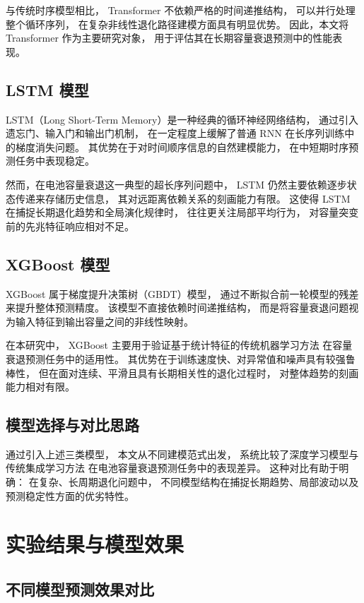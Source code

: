\documentclass[UTF8,a4paper,12pt,fontset=fandol]{ctexart}
\begin{document}
与传统时序模型相比，
Transformer 不依赖严格的时间递推结构，
可以并行处理整个循环序列，
在复杂非线性退化路径建模方面具有明显优势。
因此，本文将 Transformer 作为主要研究对象，
用于评估其在长期容量衰退预测中的性能表现。

\subsection{LSTM 模型}

LSTM（Long Short-Term Memory）是一种经典的循环神经网络结构，
通过引入遗忘门、输入门和输出门机制，
在一定程度上缓解了普通 RNN 在长序列训练中的梯度消失问题。
其优势在于对时间顺序信息的自然建模能力，
在中短期时序预测任务中表现稳定。

然而，在电池容量衰退这一典型的超长序列问题中，
LSTM 仍然主要依赖逐步状态传递来存储历史信息，
其对远距离依赖关系的刻画能力有限。
这使得 LSTM 在捕捉长期退化趋势和全局演化规律时，
往往更关注局部平均行为，
对容量突变前的先兆特征响应相对不足。

\subsection{XGBoost 模型}

XGBoost 属于梯度提升决策树（GBDT）模型，
通过不断拟合前一轮模型的残差来提升整体预测精度。
该模型不直接依赖时间递推结构，
而是将容量衰退问题视为输入特征到输出容量之间的非线性映射。

在本研究中，
XGBoost 主要用于验证基于统计特征的传统机器学习方法
在容量衰退预测任务中的适用性。
其优势在于训练速度快、对异常值和噪声具有较强鲁棒性，
但在面对连续、平滑且具有长期相关性的退化过程时，
对整体趋势的刻画能力相对有限。

\subsection{模型选择与对比思路}

通过引入上述三类模型，
本文从不同建模范式出发，
系统比较了深度学习模型与传统集成学习方法
在电池容量衰退预测任务中的表现差异。
这种对比有助于明确：
在复杂、长周期退化问题中，
不同模型结构在捕捉长期趋势、局部波动以及预测稳定性方面的优劣特性。

\section{实验结果与模型效果}

\subsection{不同模型预测效果对比}
\end{document}
